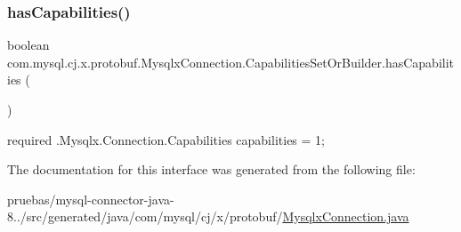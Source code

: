 \subsubsection{\texorpdfstring{has\+Capabilities()}{hasCapabilities()}}
{\footnotesize\ttfamily boolean com.\+mysql.\+cj.\+x.\+protobuf.\+Mysqlx\+Connection.\+Capabilities\+Set\+Or\+Builder.\+has\+Capabilities (\begin{DoxyParamCaption}{ }\end{DoxyParamCaption})}

{\ttfamily required .Mysqlx.\+Connection.\+Capabilities capabilities = 1;} 

The documentation for this interface was generated from the following file\+:\begin{DoxyCompactItemize}
\item 
pruebas/mysql-\/connector-\/java-\/8../src/generated/java/com/mysql/cj/x/protobuf/\mbox{\hyperlink{_mysqlx_connection_8java}{Mysqlx\+Connection.\+java}}\end{DoxyCompactItemize}
